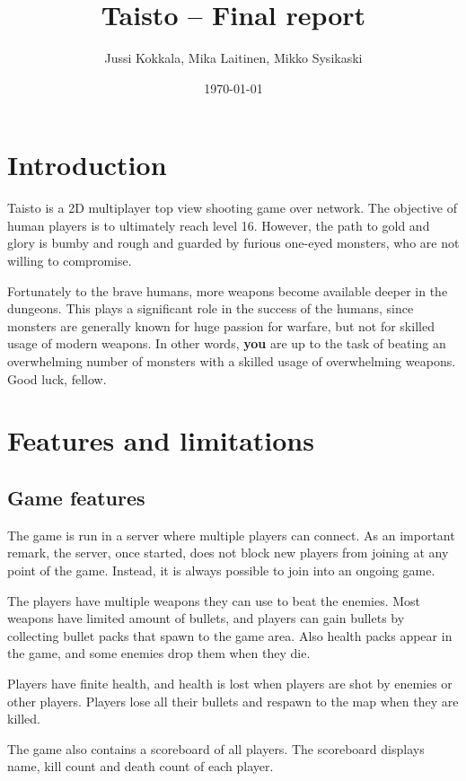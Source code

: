 \documentclass[a4paper,12pt,titlepage]{article}
\title{Taisto -- Final report}
\author{Jussi Kokkala, Mika Laitinen, Mikko Sysikaski}
\date{\today}
\begin{document}
\maketitle

\section{Introduction}
Taisto is a 2D multiplayer top view shooting game over network. The objective of human players is to ultimately reach level 16. However, the path to gold and glory is bumby and rough and guarded by furious one-eyed monsters, who are not willing to compromise. 

Fortunately to the brave humans, more weapons become available deeper in the dungeons. This plays a significant role in the success of the humans, since monsters are generally known for huge passion for warfare, but not for skilled usage of modern weapons. In other words, \textbf{you} are up to the task of beating an overwhelming number of monsters with a skilled usage of overwhelming weapons. Good luck, fellow.

\section{Features and limitations}

\subsection{Game features}

The game is run in a server where multiple players can connect.
As an important remark, the server, once started, does not block new players from
joining at any point of the game. Instead, it is always possible to join into
an ongoing game.

The players have multiple weapons they can use to beat the enemies. Most weapons have limited amount of bullets, and players can gain bullets by collecting bullet packs that spawn to the game area. Also health packs appear in the game, and some enemies drop them when they die.

Players have finite health, and health is lost when players are shot by enemies or other players. Players lose all their bullets and respawn to the map when they are killed.

The game also contains a scoreboard of all players. The scoreboard displays name, kill count and death count of each player.
\end{document}
